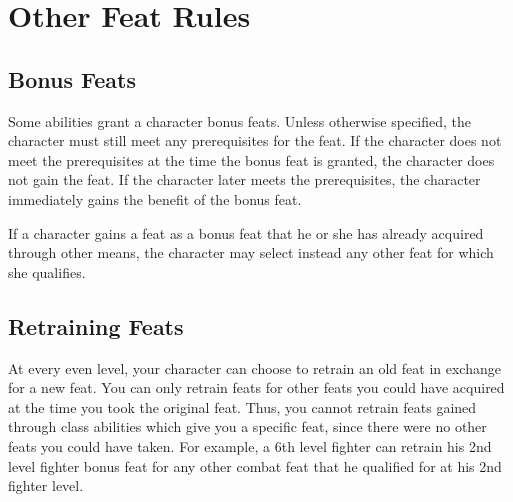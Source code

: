 \section{Other Feat Rules}

\subsection{Bonus Feats}
Some abilities grant a character bonus feats.
Unless otherwise specified, the character must still meet any prerequisites for the feat.
If the character does not meet the prerequisites at the time the bonus feat is granted, the character does not gain the feat.
If the character later meets the prerequisites, the character immediately gains the benefit of the bonus feat.

If a character gains a feat as a bonus feat that he or she has already acquired through other means, the character may select instead any other feat for which she qualifies.

\subsection{Retraining Feats}
At every even level, your character can choose to retrain an old feat in exchange for a new feat.
You can only retrain feats for other feats you could have acquired at the time you took the original feat.
Thus, you cannot retrain feats gained through class abilities which give you a specific feat, since there were no other feats you could have taken.
For example, a 6th level fighter can retrain his 2nd level fighter bonus feat for any other combat feat that he qualified for at his 2nd fighter level.
